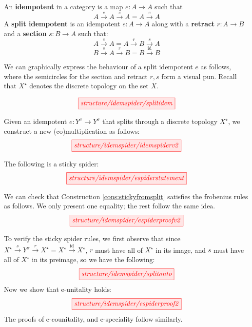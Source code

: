 \begin{myboxR}
\begin{rem}
An \textbf{idempotent} in a category is a map $e: A \rightarrow A$ such that \[A \overset{e}{\rightarrow} A \overset{e}{\rightarrow} A = A \overset{e}{\rightarrow} A\]
A \textbf{split idempotent} is an idempotent $e: A \rightarrow A$ along with a \textbf{retract} $r: A \rightarrow B$ and a \textbf{section} $s: B \rightarrow A$ such that:
\[A \overset{e}{\rightarrow} A = A \overset{r}{\rightarrow} B \overset{s}{\rightarrow} A\]
\[B \overset{s}{\rightarrow} A \overset{r}{\rightarrow} B = B \overset{\mathop{id}}{\rightarrow} B\]
\end{rem}

We can graphically express the behaviour of a split idempotent $e$ as follows, where the semicircles for the section and retract $r,s$ form a visual pun. Recall that $X^\star$ denotes the discrete topology on the set $X$.

\[\scalebox{1}{\tikzfig{structure/idemspider/splitidem}}\]
\end{myboxR}

\begin{myboxB}
\begin{construction}\label{cons:stickyfromsplit}
Given an idempotent $e: Y^\sigma \rightarrow Y^\sigma$ that splits through a discrete topology $X^\star$, we construct a new (co)multiplication as follows:
\[\scalebox{1}{\tikzfig{structure/idemspider/idemspiderv2}}\]
\end{construction}
\end{myboxB}

\begin{myboxR}
\begin{proposition}\label{prop:splitmeanssticky} The following is a sticky spider:
\[\scalebox{1}{\tikzfig{structure/idemspider/espiderstatement}}\]
\end{proposition}
We can check that Construction \ref{cons:stickyfromsplit} satisfies the frobenius rules as follows. We only present one equality; the rest follow the same idea.
\[\scalebox{1}{\tikzfig{structure/idemspider/espiderproofv2}}\]
\end{myboxR}
\begin{myboxR}
To verify the sticky spider rules, we first observe that since $X^\star \overset{s}{\rightarrow} Y^\sigma \overset{r}{\rightarrow} X^\star = X^\star \overset{\mathop{id}}{\rightarrow} X^\star$, $r$ must have all of $X^\star$ in its image, and $s$ must have all of $X^\star$ in its preimage, so we have the following:
\[\scalebox{1}{\tikzfig{structure/idemspider/splitonto}}\]
Now we show that e-unitality holds:
\[\scalebox{1}{\tikzfig{structure/idemspider/espiderproof2}}\]
The proofs of e-counitality, and e-speciality follow similarly.
\end{myboxR}

